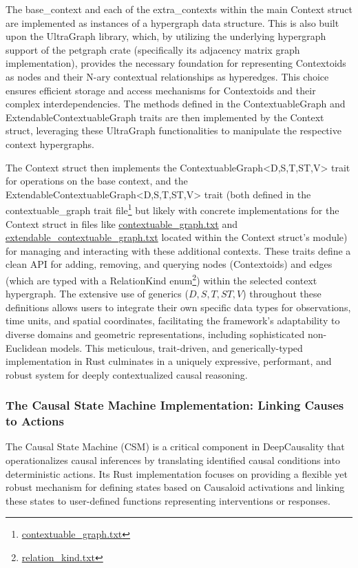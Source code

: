 The base\_context and each of the extra\_contexts within the main Context struct are implemented as instances of a hypergraph data structure. This is also built upon the UltraGraph library, which, by utilizing the underlying hypergraph support of the petgraph crate (specifically its adjacency matrix graph implementation), provides the necessary foundation for representing Contextoids as nodes and their N-ary contextual relationships as hyperedges. This choice ensures efficient storage and access mechanisms for Contextoids and their complex interdependencies. The methods defined in the ContextuableGraph and ExtendableContextuableGraph traits are then implemented by the Context struct, leveraging these UltraGraph functionalities to manipulate the respective context hypergraphs.

The Context struct then implements the ContextuableGraph<D,S,T,ST,V> trait for operations on the base context, and the ExtendableContextuableGraph<D,S,T,ST,V> trait (both defined in the contextuable\_graph trait file\footnote{\url{contextuable_graph.txt}} but likely with concrete implementations for the Context struct in files like \url{contextuable_graph.txt} and \url{extendable_contextuable_graph.txt} located within the Context struct's module) for managing and interacting with these additional contexts. These traits define a clean API for adding, removing, and querying nodes (Contextoids) and edges (which are typed with a RelationKind enum\footnote{\url{relation_kind.txt}}) within the selected context hypergraph. The extensive use of generics ($D, S, T, ST, V$) throughout these definitions allows users to integrate their own specific data types for observations, time units, and spatial coordinates, facilitating the framework's adaptability to diverse domains and geometric representations, including sophisticated non-Euclidean models. This meticulous, trait-driven, and generically-typed implementation in Rust culminates in a uniquely expressive, performant, and robust system for deeply contextualized causal reasoning.

\subsubsection{The Causal State Machine Implementation: Linking Causes to Actions}
\label{subsubsec:csm_implementation}

The Causal State Machine (CSM) is a critical component in DeepCausality that operationalizes causal inferences by translating identified causal conditions into deterministic actions. Its Rust implementation focuses on providing a flexible yet robust mechanism for defining states based on Causaloid activations and linking these states to user-defined functions representing interventions or responses.

